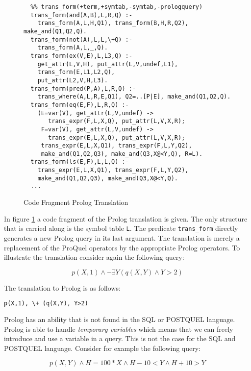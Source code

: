 \begin{figure}
{\small
\begin{verbatim}
  %% trans_form(+term,+symtab,-symtab,-prologquery)
  trans_form(and(A,B),L,R,Q) :- 
    trans_form(A,L,H,Q1), trans_form(B,H,R,Q2), make_and(Q1,Q2,Q).
  trans_form(not(A),L,L,\+Q) :- 
    trans_form(A,L,_,Q).
  trans_form(ex(V,E),L,L3,Q) :-
    get_attr(L,V,H), put_attr(L,V,undef,L1), 
    trans_form(E,L1,L2,Q),
    put_attr(L2,V,H,L3).    
  trans_form(pred(P,A),L,R,Q) :-
    trans_where(A,L,R,E,Q1), Q2=..[P|E], make_and(Q1,Q2,Q).
  trans_form(eq(E,F),L,R,Q) :- 
    (E=var(V), get_attr(L,V,undef) -> 
       trans_expr(F,L,X,Q), put_attr(L,V,X,R);
     F=var(V), get_attr(L,V,undef) -> 
       trans_expr(E,L,X,Q), put_attr(L,V,X,R);
     trans_expr(E,L,X,Q1), trans_expr(F,L,Y,Q2),
     make_and(Q1,Q2,Q3), make_and(Q3,X@<Y,Q), R=L).
  trans_form(ls(E,F),L,L,Q) :- 
    trans_expr(E,L,X,Q1), trans_expr(F,L,Y,Q2),
    make_and(Q1,Q2,Q3), make_and(Q3,X@<Y,Q).
  ...
\end{verbatim}
}
\label{transprolog}
\caption{Code Fragment Prolog Translation}
\end{figure}

In figure \ref{transprolog} a code fragment of the Prolog translation is given. The only
structure that is carried along is the symbol table \verb.L.. The predicate \verb.trans_form. 
directly generates a new Prolog query in its last argument. The translation is merely a 
replacement of the ProQuel operators by the appropriate Prolog operators. To illustrate 
the translation consider again the following query:

\begin{displaymath}
p(X,1) \wedge \neg \exists Y(q(X,Y) \wedge Y>2)
\end{displaymath}

The translation to Prolog is as follows:

\begin{center}
\verb.p(X,1), \+ (q(X,Y), Y>2).
\end{center}

Prolog has an ability that is not found in the SQL or POSTQUEL language. Prolog is able to 
handle {\em temporary variables} which means that we can freely introduce and use a variable  
in a query. This is not the case for the SQL and POSTQUEL language. Consider for example 
the following query:

\begin{displaymath}
p(X,Y) \wedge H\!=\!100\!*\!X \wedge H\!-\!10\!<\!Y \wedge H\!+\!10\!>\!Y
\end{displaymath}

